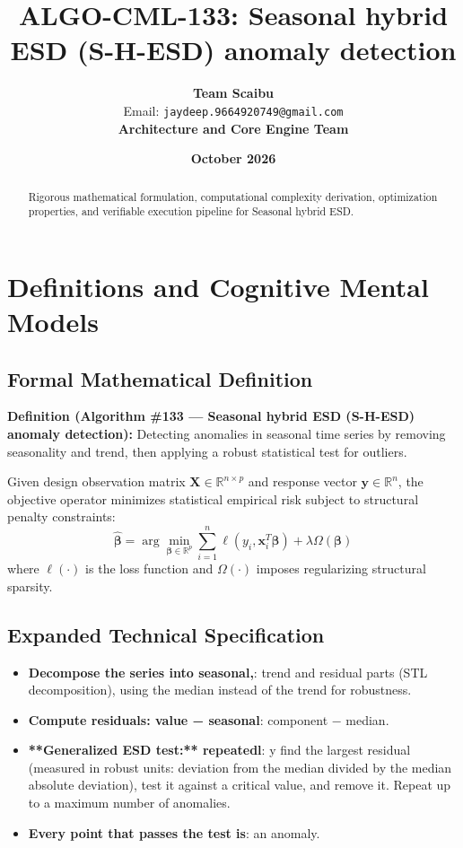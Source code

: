 \documentclass[11pt,a4paper]{article}
\title{\textbf{ALGO-CML-133: Seasonal hybrid ESD (S-H-ESD) anomaly detection}}
\author{\textbf{Team Scaibu} \\ \small Email: \texttt{jaydeep.9664920749@gmail.com} \\ \small \textbf{Architecture and Core Engine Team}}
\date{\textbf{October 2026}}
\theoremstyle{definition}
\begin{document}
\maketitle

\begin{abstract}
Rigorous mathematical formulation, computational complexity derivation, optimization properties, and verifiable execution pipeline for Seasonal hybrid ESD.
\end{abstract}

\section{Definitions and Cognitive Mental Models}

\subsection{Formal Mathematical Definition}
\textbf{Definition (Algorithm \#133 --- Seasonal hybrid ESD (S-H-ESD) anomaly detection):}
Detecting anomalies in seasonal time series by removing seasonality and trend, then applying a robust statistical test for outliers.

Given design observation matrix $\mathbf{X} \in \mathbb{R}^{n \times p}$ and response vector $\mathbf{y} \in \mathbb{R}^n$, the objective operator minimizes statistical empirical risk subject to structural penalty constraints:
\begin{equation}
\hat{\boldsymbol{\beta}} = \arg\min_{\boldsymbol{\beta} \in \mathbb{R}^p} \sum_{i=1}^n \ell(y_i, \mathbf{x}_i^T \boldsymbol{\beta}) + \lambda \Omega(\boldsymbol{\beta})
\end{equation}
where $\ell(\cdot)$ is the loss function and $\Omega(\cdot)$ imposes regularizing structural sparsity.

\subsection{Expanded Technical Specification}
\begin{itemize}
\item \textbf{Decompose the series into seasonal,}:  trend and residual parts (STL decomposition), using the median instead of the trend for robustness.
\item \textbf{Compute residuals: value − seasonal}:  component − median.
\item \textbf{**Generalized ESD test:** repeatedl}: y find the largest residual (measured in robust units: deviation from the median divided by the median absolute deviation), test it against a critical value, and remove it. Repeat up to a maximum number of anomalies.
\item \textbf{Every point that passes the test is}:  an anomaly.
\end{itemize}
\end{document}
